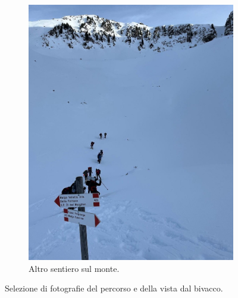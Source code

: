 \documentclass{article}
\begin{document}
\begin{figure}[H]
\begin{subfigure}[b]{0.45\textwidth}
        \includegraphics[width=\textwidth]{images/foto_sentiero2.jpg}
        \caption{Altro sentiero sul monte.}
    \end{subfigure}
    \hfill

    \caption{Selezione di fotografie del percorso e della vista dal bivacco.}
\end{figure}
\end{document}
